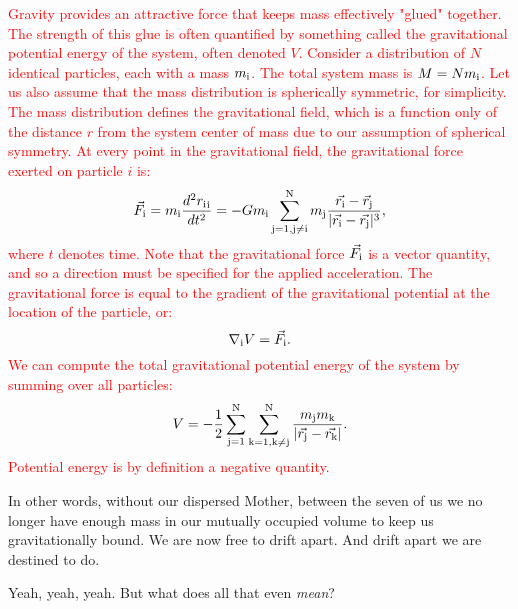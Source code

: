 \documentclass[main.tex]{subfiles}
\begin{document}
\begin{tcolorbox}[sharp corners, colback=red!30, colframe=red!80!blue, title=Gravitational Potential Energy]
\par \textcolor{red} {Gravity provides an attractive force that keeps mass effectively "glued" together.  The strength of this glue is often quantified by something called the gravitational potential energy of the system, often denoted $V$.  Consider a distribution of $N$ identical particles, each with a mass $m_{\rm i}$.  The total system mass is $M = Nm_{\rm i}$.  Let us also assume that the mass distribution is spherically symmetric, for simplicity.  The mass distribution defines the gravitational field, which is a function only of the distance $r$ from the system center of mass due to our assumption of spherical symmetry.  At every point in the gravitational field, the gravitational force exerted on particle $i$ is:
\begin{equation}
\vec{F}_{\rm i} = m_{\rm i}\frac{d^2{r_{\rm i}}_{\rm i}}{dt^2} = -Gm_{\rm i}\sum_{\rm j=1,j \ne i}^{\rm N}m_{\rm j}\frac{\vec{r_{\rm i}} - \vec{r}_{\rm j}}{|\vec{r_{\rm i}} - \vec{r_{\rm j}}|^3},
\label{eqn:force}
\end{equation}
where $t$ denotes time.  Note that the gravitational force $\vec{F}_{\rm i}$ is a vector quantity, and so a direction must be specified for the applied acceleration.  The gravitational force is equal to the gradient of the gravitational potential at the location of the particle, or:
\begin{equation}
\nabla_{\rm i}V = \vec{F}_{\rm i}.
\end{equation}
We can compute the total gravitational potential energy of the system by summing over all particles:
\begin{equation}
V = -\frac{1}{2}\sum_{\rm j=1}^{\rm N}\sum_{\rm k=1, k \ne j}^{\rm N}\frac{m_{\rm j}m_{\rm k}}{|\vec{r_{\rm j}} - \vec{r_{\rm k}}|}.
\end{equation}
Potential energy is by definition a negative quantity.}
\end{tcolorbox}


\par \Maia In other words, without our dispersed Mother, between the seven of us we no longer have enough mass in our mutually occupied volume to keep us gravitationally bound.  We are now free to drift apart.  And drift apart we are destined to do. 


\par \Taygete Yeah, yeah, yeah.  But what does all that even \textit{mean}?
\end{document}
